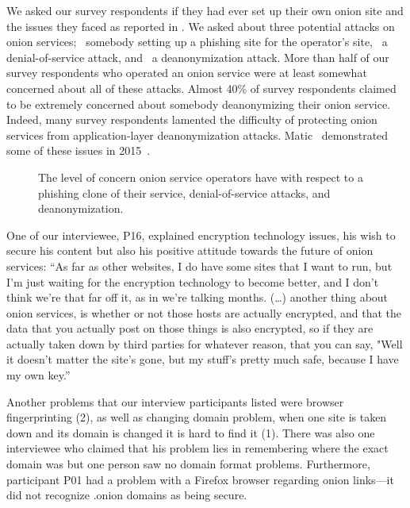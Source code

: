 We asked our survey respondents if they had ever set up their own onion site and
the issues they faced as reported in .  We
asked about three potential attacks on onion services; \first~somebody setting
up a phishing site for the operator's site, \second~a denial-of-service attack,
and \third~a deanonymization attack.  More than half of our survey respondents
who operated an onion service were at least somewhat concerned about all of
these attacks.  Almost 40\% of survey respondents claimed to be extremely
concerned about somebody deanonymizing their onion service.  Indeed, many survey
respondents lamented the difficulty of protecting onion services from
application-layer deanonymization attacks.  Matic \ea\ demonstrated some of
these issues in 2015~\cite{Matic2015a}.

\begin{figure}[t]
    \centering
    
    \caption{The level of concern onion service operators have with respect to a
    phishing clone of their service, denial-of-service attacks, and
    deanonymization.}
    \label{fig:onion-operation-concerns}
\end{figure}

One of our interviewee, P16, explained encryption technology issues, his wish to
secure his content but also his positive attitude towards the future of onion
services: ``As far as other websites, I do have some sites that I want to run,
but I'm just waiting for the encryption technology to become better, and I don't
think we're that far off it, as in we're talking months. (\ldots) another thing
about onion services, is whether or not those hosts are actually encrypted, and
that the data that you actually post on those things is also encrypted, so if
they are actually taken down by third parties for whatever reason, that you can
say, "Well it doesn't matter the site's gone, but my stuff's pretty much safe,
because I have my own key.''

Another problems that our interview participants listed were browser
fingerprinting (2), as well as changing domain problem, when one site is taken
down and its domain is changed it is hard to find it (1). There was also one
interviewee who claimed that his problem lies in remembering where the exact
domain was but one person saw no domain format problems. Furthermore,
participant P01 had a problem with a Firefox  browser regarding onion links---it
did not recognize .onion domains as being secure. 

